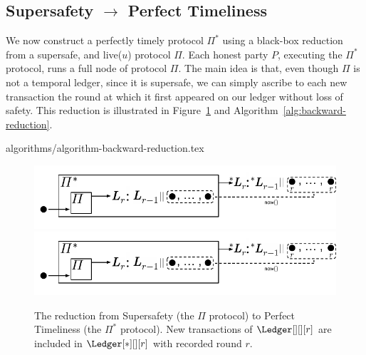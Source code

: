 \subsection{Supersafety $\rightarrow$ Perfect Timeliness}\label{sec:backward-reduction}

We now construct a perfectly timely protocol $\Pi^*$
using a black-box reduction from a supersafe, and live($u$) protocol $\Pi$.
Each honest party $P$, executing the $\Pi^*$ protocol, runs a
full node of protocol $\Pi$.
The main idea is that, even though $\Pi$ is not a temporal ledger,
since it is supersafe, we can simply
ascribe to each new transaction the round at which it first appeared on our ledger
without loss of safety.
This reduction is illustrated in Figure~\ref{fig:backward-reduction}
and Algorithm~\ref{alg:backward-reduction}.

{algorithms/algorithm-backward-reduction.tex}

\begin{figure}
  \centering
  \iflncs
    \includegraphics[width=0.9\columnwidth,keepaspectratio]{figures/backward-reduction.pdf}
  \fi
  \ifccs
    \includegraphics[width=1.4\columnwidth,keepaspectratio]{figures/backward-reduction.pdf}
  \fi
  \caption{The reduction from Supersafety
    (the $\Pi$ protocol) to Perfect Timeliness (the $\Pi^*$ protocol).
    New transactions of $\Ledger[][][r]$ are included in
    $\Ledger[*][][r]$ with recorded round $r$.
  }
 \label{fig:backward-reduction}
\end{figure}


